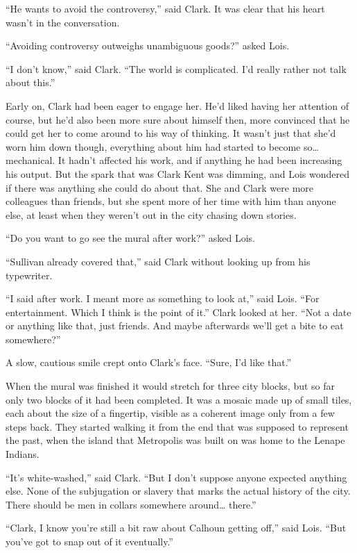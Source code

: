 ``He wants to avoid the controversy,'' said Clark. It was clear that his
heart wasn't in the conversation.

``Avoiding controversy outweighs unambiguous goods?'' asked Lois.

``I don't know,'' said Clark. ``The world is complicated. I'd really
rather not talk about this.''

Early on, Clark had been eager to engage her. He'd liked having her
attention of course, but he'd also been more sure about himself then,
more convinced that he could get her to come around to his way of
thinking. It wasn't just that she'd worn him down though, everything
about him had started to become so\ldots{} mechanical. It hadn't
affected his work, and if anything he had been increasing his output.
But the spark that was Clark Kent was dimming, and Lois wondered if
there was anything she could do about that. She and Clark were more
colleagues than friends, but she spent more of her time with him than
anyone else, at least when they weren't out in the city chasing down
stories.

``Do you want to go see the mural after work?'' asked Lois.

``Sullivan already covered that,'' said Clark without looking up from
his typewriter.

``I said after work. I meant more as something to look at,'' said Lois.
``For entertainment. Which I think is the point of it.'' Clark looked at
her. ``Not a date or anything like that, just friends. And maybe
afterwards we'll get a bite to eat somewhere?''

A slow, cautious smile crept onto Clark's face. ``Sure, I'd like that.''

When the mural was finished it would stretch for three city blocks, but
so far only two blocks of it had been completed. It was a mosaic made up
of small tiles, each about the size of a fingertip, visible as a
coherent image only from a few steps back. They started walking it from
the end that was supposed to represent the past, when the island that
Metropolis was built on was home to the Lenape Indians.

``It's white‐washed,'' said Clark. ``But I don't suppose anyone expected
anything else. None of the subjugation or slavery that marks the actual
history of the city. There should be men in collars somewhere
around\ldots{} there.''

``Clark, I know you're still a bit raw about Calhoun getting off,'' said
Lois. ``But you've got to snap out of it eventually.''

